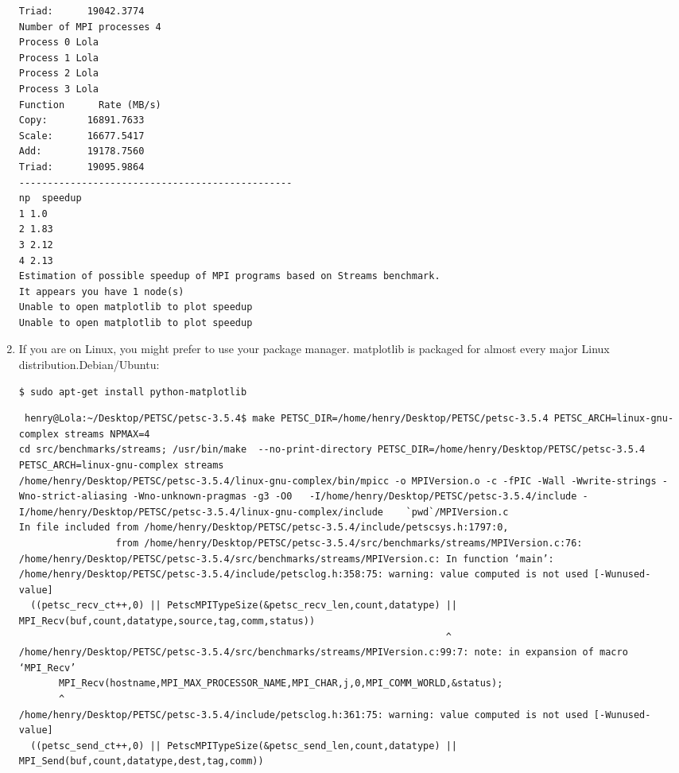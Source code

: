 \documentclass{article}
\begin{document}
\begin{enumerate}
\begin{verbatim}
Triad:      19042.3774
Number of MPI processes 4
Process 0 Lola
Process 1 Lola
Process 2 Lola
Process 3 Lola
Function      Rate (MB/s) 
Copy:       16891.7633
Scale:      16677.5417
Add:        19178.7560
Triad:      19095.9864
------------------------------------------------
np  speedup
1 1.0
2 1.83
3 2.12
4 2.13
Estimation of possible speedup of MPI programs based on Streams benchmark.
It appears you have 1 node(s)
Unable to open matplotlib to plot speedup
Unable to open matplotlib to plot speedup
\end{verbatim}
\normalsize
\item If you are on Linux, you might prefer to use your package manager. matplotlib is packaged for almost every major Linux distribution.Debian/Ubuntu: 
\begin{verbatim}
$ sudo apt-get install python-matplotlib
\end{verbatim}
\tiny
\begin{verbatim}
 henry@Lola:~/Desktop/PETSC/petsc-3.5.4$ make PETSC_DIR=/home/henry/Desktop/PETSC/petsc-3.5.4 PETSC_ARCH=linux-gnu-complex streams NPMAX=4
cd src/benchmarks/streams; /usr/bin/make  --no-print-directory PETSC_DIR=/home/henry/Desktop/PETSC/petsc-3.5.4 PETSC_ARCH=linux-gnu-complex streams
/home/henry/Desktop/PETSC/petsc-3.5.4/linux-gnu-complex/bin/mpicc -o MPIVersion.o -c -fPIC -Wall -Wwrite-strings -Wno-strict-aliasing -Wno-unknown-pragmas -g3 -O0   -I/home/henry/Desktop/PETSC/petsc-3.5.4/include -I/home/henry/Desktop/PETSC/petsc-3.5.4/linux-gnu-complex/include    `pwd`/MPIVersion.c
In file included from /home/henry/Desktop/PETSC/petsc-3.5.4/include/petscsys.h:1797:0,
                 from /home/henry/Desktop/PETSC/petsc-3.5.4/src/benchmarks/streams/MPIVersion.c:76:
/home/henry/Desktop/PETSC/petsc-3.5.4/src/benchmarks/streams/MPIVersion.c: In function ‘main’:
/home/henry/Desktop/PETSC/petsc-3.5.4/include/petsclog.h:358:75: warning: value computed is not used [-Wunused-value]
  ((petsc_recv_ct++,0) || PetscMPITypeSize(&petsc_recv_len,count,datatype) || MPI_Recv(buf,count,datatype,source,tag,comm,status))
                                                                           ^
/home/henry/Desktop/PETSC/petsc-3.5.4/src/benchmarks/streams/MPIVersion.c:99:7: note: in expansion of macro ‘MPI_Recv’
       MPI_Recv(hostname,MPI_MAX_PROCESSOR_NAME,MPI_CHAR,j,0,MPI_COMM_WORLD,&status);
       ^
/home/henry/Desktop/PETSC/petsc-3.5.4/include/petsclog.h:361:75: warning: value computed is not used [-Wunused-value]
  ((petsc_send_ct++,0) || PetscMPITypeSize(&petsc_send_len,count,datatype) || MPI_Send(buf,count,datatype,dest,tag,comm))

\end{verbatim}
\end{enumerate}
\end{document}
